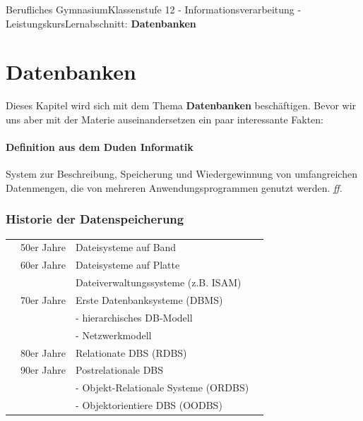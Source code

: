 \documentclass[11pt,oneside,openany,headings=optiontotoc,11pt,numbers=noenddot]{article}
\begin{document}
	\begin{worksheet}{Berufliches Gymnasium}{Klassenstufe 12 - Informationsverarbeitung - Leistungskurs}{Lernabschnitt: \textbf{Datenbanken}}
		\setlength{\columnseprule}{0pt}
		
		\section{Datenbanken}
		Dieses Kapitel wird sich mit dem Thema \textbf{Datenbanken} beschäftigen. Bevor wir uns aber mit der Materie auseinandersetzen ein paar interessante Fakten:
		\paragraph{Definition aus dem \glqq{}Duden Informatik\grqq{}} System zur Beschreibung, Speicherung und Wiedergewinnung von umfangreichen Datenmengen, die von mehreren Anwendungsprogrammen genutzt werden. \textit{ff.}
		\subsubsection*{Historie der Datenspeicherung}
		\begin{listliketab}
			\begin{tabular}{Llll}
				\textbullet & 50er Jahre & Dateisysteme auf Band\\
				\textbullet & 60er Jahre & Dateisysteme auf Platte\\
				& & Dateiverwaltungssysteme (z.B. ISAM)\\
				\textbullet & 70er Jahre & Erste Datenbanksysteme (DBMS)\\
				& & - \hspace{0.2cm} hierarchisches DB-Modell\\
				& & - \hspace{0.2cm} Netzwerkmodell\\
				\textbullet & 80er Jahre & Relationate DBS (RDBS)\\
				\textbullet & 90er Jahre & Postrelationale DBS\\
				& & - \hspace{0.2cm} Objekt-Relationale Systeme (ORDBS)\\
				& & - \hspace{0.2cm} Objektorientiere DBS (OODBS)\\
			\end{tabular}
		\end{listliketab}

\end{worksheet}
\end{document}
